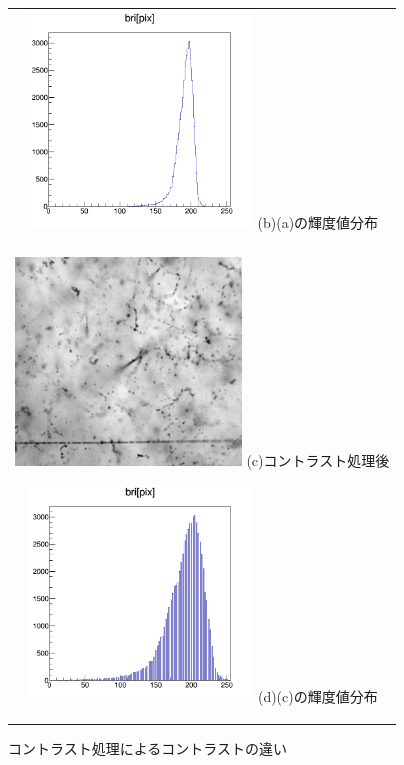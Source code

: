 \documentclass[12pt,a4paper]{jarticle}
\begin{document}
\begin{figure}[htbp]
\begin{tabular}{c}
        \begin{minipage}{0.5\hsize}
          \centering
            \includegraphics[clip, width=60mm]{row_hist.png}
            \hspace{1.6cm} (b)(a)の輝度値分布
        \end{minipage}
        \\
        \\
        \begin{minipage}{0.5\hsize}
          \centering
              \includegraphics[clip, width=60mm]{cont.png}
              \hspace{1.6cm} (c)コントラスト処理後
          \end{minipage}
          
        \begin{minipage}{0.5\hsize}
          \centering
              \includegraphics[clip, width=60mm]{cont_hist.png}
              \hspace{1.6cm} (d)(c)の輝度値分布
        \end{minipage}
    
      \end{tabular}
      \caption{コントラスト処理によるコントラストの違い\label{fig:do_contrust_beforeandafter}}
\end{figure}
\end{document}

